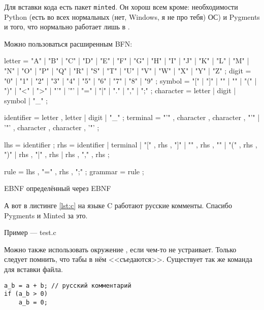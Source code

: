 \else

Для вставки кода есть пакет \texttt{minted}. Он хорош всем кроме: необходимости Python (есть во всех нормальных (нет, Windows, я не про тебя) ОС) и Pygments и того, что нормально работает лишь в \XeLaTeX.

Можно пользоваться расширенным BFN:

\begin{listing}[H]
\begin{ebnfcode}
 letter = "A" | "B" | "C" | "D" | "E" | "F" | "G"
       | "H" | "I" | "J" | "K" | "L" | "M" | "N"
       | "O" | "P" | "Q" | "R" | "S" | "T" | "U"
       | "V" | "W" | "X" | "Y" | "Z" ;
digit = "0" | "1" | "2" | "3" | "4" | "5" | "6" | "7" | "8" | "9" ;
symbol = "[" | "]" | "{" | "}" | "(" | ")" | "<" | ">"
       | "'" | '"' | "=" | "|" | "." | "," | ";" ;
character = letter | digit | symbol | "_" ;
 
identifier = letter , { letter | digit | "_" } ;
terminal = "'" , character , { character } , "'" 
         | '"' , character , { character } , '"' ;
 
lhs = identifier ;
rhs = identifier
     | terminal
     | "[" , rhs , "]"
     | "{" , rhs , "}"
     | "(" , rhs , ")"
     | rhs , "|" , rhs
     | rhs , "," , rhs ;
 
rule = lhs , "=" , rhs , ";" ;
grammar = { rule } ;
\end{ebnfcode}
\caption{EBNF определённый через EBNF}
\label{lst:ebnf}
\end{listing}

А вот в листинге \ref{lst:c} на языке C работают русские комменты. Спасибо Pygments и Minted за это.

\begin{listing}[H]
\caption{Пример — test.c} 
\end{listing}
\label{lst:c}

\fi





Можно также использовать окружение , если  чем-то не
устраивает. Только следует помнить, что табы в нём <<съедаются>>. Существует так же команда  для вставки файла.

\begin{verbatim}
a_b = a + b; // русский комментарий
if (a_b > 0)
    a_b = 0;
\end{verbatim}

